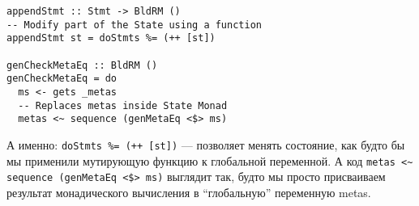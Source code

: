 \begin{lstlisting}[frame=single]
appendStmt :: Stmt -> BldRM ()
-- Modify part of the State using a function
appendStmt st = doStmts %= (++ [st])

genCheckMetaEq :: BldRM ()
genCheckMetaEq = do
  ms <- gets _metas
  -- Replaces metas inside State Monad
  metas <~ sequence (genMetaEq <$> ms)
\end{lstlisting}

А именно: \lstinline{doStmts %= (++ [st])} --- позволяет менять состояние, как будто бы мы применили мутирующую функцию к глобальной переменной. А код \lstinline{metas <~ sequence (genMetaEq <$> ms)} выглядит так, будто мы просто присваиваем результат монадического вычисления в ``глобальную'' переменную metas.











